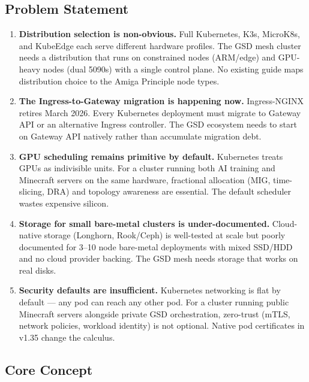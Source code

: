 \documentclass[11pt,letterpaper]{article}
\begin{document}
\subsection{Problem Statement}

\begin{enumerate}[leftmargin=2em]
\item \textbf{Distribution selection is non-obvious.} Full Kubernetes, K3s, MicroK8s, and KubeEdge each serve different hardware profiles. The GSD mesh cluster needs a distribution that runs on constrained nodes (ARM/edge) and GPU-heavy nodes (dual 5090s) with a single control plane. No existing guide maps distribution choice to the Amiga Principle node types.

\item \textbf{The Ingress-to-Gateway migration is happening now.} Ingress-NGINX retires March 2026. Every Kubernetes deployment must migrate to Gateway API or an alternative Ingress controller. The GSD ecosystem needs to start on Gateway API natively rather than accumulate migration debt.

\item \textbf{GPU scheduling remains primitive by default.} Kubernetes treats GPUs as indivisible units. For a cluster running both AI training and Minecraft servers on the same hardware, fractional allocation (MIG, time-slicing, DRA) and topology awareness are essential. The default scheduler wastes expensive silicon.

\item \textbf{Storage for small bare-metal clusters is under-documented.} Cloud-native storage (Longhorn, Rook/Ceph) is well-tested at scale but poorly documented for 3--10 node bare-metal deployments with mixed SSD/HDD and no cloud provider backing. The GSD mesh needs storage that works on real disks.

\item \textbf{Security defaults are insufficient.} Kubernetes networking is flat by default --- any pod can reach any other pod. For a cluster running public Minecraft servers alongside private GSD orchestration, zero-trust (mTLS, network policies, workload identity) is not optional. Native pod certificates in v1.35 change the calculus.
\end{enumerate}

\subsection{Core Concept}
\end{document}
